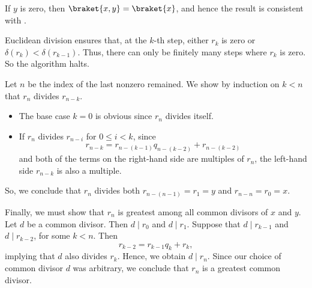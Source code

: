 \begin{defproof}
  If \( y \) is zero, then \( \braket{ x, y } = \braket{ x } \), and hence the result is consistent with .

  Euclidean division ensures that, at the \( k \)-th step, either \( r_k \) is zero or \( \delta(r_k) < \delta(r_{k-1}) \). Thus, there can only be finitely many steps where \( r_k \) is zero. So the algorithm halts.

  Let \( n \) be the index of the last nonzero remained. We show by induction on \( k < n \) that \( r_n \) divides \( r_{n-k} \).

  \begin{itemize}
    \item The base case \( k = 0 \) is obvious since \( r_n \) divides itself.
    \item If \( r_n \) divides \( r_{n-i} \) for \( 0 \leq i < k \), since
    \begin{equation*}
      r_{n-k} = r_{n-(k-1)} q_{n-(k-2)} + r_{n-(k-2)}
    \end{equation*}
    and both of the terms on the right-hand side are multiples of \( r_n \), the left-hand side \( r_{n-k} \) is also a multiple.
  \end{itemize}

  So, we conclude that \( r_n \) divides both \( r_{n-(n-1)} = r_1 = y \) and \( r_{n-n} = r_0 = x \).

  Finally, we must show that \( r_n \) is greatest among all common divisors of \( x \) and \( y \). Let \( d \) be a common divisor. Then \( d \mid r_0 \) and \( d \mid r_1 \). Suppose that \( d \mid r_{k-1} \) and \( d \mid r_{k-2} \), for some \( k < n \). Then
  \begin{equation*}
    r_{k-2} = r_{k-1} q_k + r_k,
  \end{equation*}
  implying that \( d \) also divides \( r_k \). Hence, we obtain \( d \mid r_n \). Since our choice of common divisor \( d \) was arbitrary, we conclude that \( r_n \) is a greatest common divisor.
\end{defproof}

